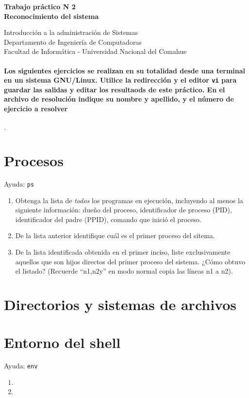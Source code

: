 \documentclass[12pt]{article}
\def\maketitle{

 \makeatletter
 {\color{bl} \centering \huge \sc \textbf{
Trabajo práctico N 2 \\
\large \vspace*{-8pt} \color{black} Reconocimiento del sistema
 \vspace*{8pt} }\par}
 \makeatother


 \makeatletter
 {\centering \small 
	Introducción a la administración de Sistemas \\
 	Departamento de Ingeniería de Computadoras \\
 	Facultad de Informática - Universidad Nacional del Comahue \\
 	\vspace{20pt} }
 \makeatother

}
\begin{document}
\thispagestyle{empty}
\maketitle
\setlength{\parindent}{0pt}

\paragraph{Los siguientes ejercicios se realizan en su totalidad desde una terminal en un sistema GNU/Linux. Utilice la redirección y el editor \texttt{vi} para guardar las salidas y editar los resultaods de este práctico. En el archivo de resolución indique su nombre y apellido, y el número de ejercicio a resolver}. 

\section*{Procesos}
Ayuda: \texttt{ps}
\begin{enumerate}
\item Obtenga la lista de \textit{todos} los programas en ejecución, incluyendo al menos la siguiente información: dueño del proceso, identificador de proceso (PID), identificador del padre (PPID), comando que inició el proceso. 
\item De la lista anterior identifique cuál es el primer proceso del sitema.
\item De la lista identificada obtenida en el primer inciso, liste exclusivamente aquellos que son hijos directos del primer proceso del sistema. ¿Cómo obtuvo el listado? (Recuerde ``n1,n2y'' en modo normal copia las líneas n1 a n2).
\end{enumerate}

\section*{Directorios y sistemas de archivos}

\section*{Entorno del shell}
Ayuda: \texttt{env}
\begin{enumerate}
\item 
\item
\end{enumerate}
\end{document}
